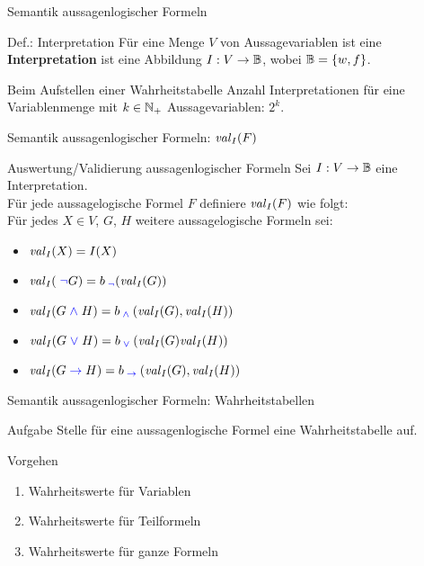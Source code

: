 \begin{frame}{Semantik aussagenlogischer Formeln}
	\begin{block}{Def.: Interpretation}
		Für eine Menge \(V\) von Aussagevariablen ist eine \textbf{Interpretation} ist eine Abbildung \(I: V \to \mathbb{B}\), wobei \( \mathbb{B} = \{ w, f \} \).
	\end{block}

	\begin{exampleblock}{Beim Aufstellen einer Wahrheitstabelle}
		Anzahl Interpretationen für eine Variablenmenge mit \(k \in \mathbb{N}_+ \) Aussagevariablen: \(2^k\).
	\end{exampleblock}
\end{frame}

\begin{frame}{Semantik aussagenlogischer Formeln: $\hbox{\textit{val}}_I(F)$}
	\begin{block}{Auswertung/Validierung aussagenlogischer Formeln}
		Sei \(I: V \to \mathbb{B}\) eine Interpretation.\\
		Für jede aussagelogische Formel $F$ definiere $\hbox{\textit{val}}_I(F)$ wie folgt:\\[2ex]

		Für jedes $X \in V$, $G$, $H$ weitere aussagelogische Formeln sei:
		\begin{itemize}
			\item $\hbox{\textit{val}}_I(X)         = I(X) $
  			\item $\hbox{\textit{val}}_I(\text{\;}\textcolor{blue}{\neg}\text{} G)   = b_{\text{\;}\textcolor{blue}{\neg}\text{}}(\hbox{\textit{val}}_I(G)) $
  			\item $\hbox{\textit{val}}_I(G \text{\;}\textcolor{blue}{\wedge}\text{\;} H) = b_{\text{\;}\textcolor{blue}{\wedge}\text{\;}}(\hbox{\textit{val}}_I(G), \hbox{\textit{val}}_I(H)) $
  			\item $\hbox{\textit{val}}_I(G \text{\;}\textcolor{blue}{\vee}\text{\;} H) = b_{\text{\;}\textcolor{blue}{\vee}\text{\;}}(\hbox{\textit{val}}_I(G)  \hbox{\textit{val}}_I(H)) $
  			\item $\hbox{\textit{val}}_I(G \text{\;}\textcolor{blue}{\to}\text{\;} H) = b_{\text{\;}\textcolor{blue}{\to}\text{\;}}(\hbox{\textit{val}}_I(G), \hbox{\textit{val}}_I(H)) $
		\end{itemize}
	\end{block}
\end{frame}


\begin{frame}{Semantik aussagenlogischer Formeln: Wahrheitstabellen}
	\begin{exampleblock}{Aufgabe}
		Stelle für eine aussagenlogische Formel eine Wahrheitstabelle auf.
	\end{exampleblock}

	\begin{exampleblock}{Vorgehen}
	\pause
		\begin{enumerate}[<+->]
			\item Wahrheitswerte für Variablen
			\item Wahrheitswerte für Teilformeln
			\item Wahrheitswerte für ganze Formeln
		\end{enumerate}
	\end{exampleblock}
\end{frame}

